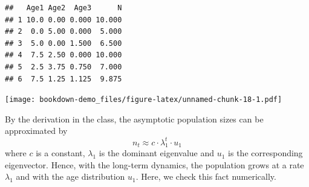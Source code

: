 \documentclass[
]{book}
\newenvironment{Shaded}{\begin{snugshade}}{\end{snugshade}}
\newcommand{\CommentTok}[1]{\textcolor[rgb]{0.56,0.35,0.01}{\textit{#1}}}
\newcommand{\DataTypeTok}[1]{\textcolor[rgb]{0.13,0.29,0.53}{#1}}
\newcommand{\DecValTok}[1]{\textcolor[rgb]{0.00,0.00,0.81}{#1}}
\newcommand{\KeywordTok}[1]{\textcolor[rgb]{0.13,0.29,0.53}{\textbf{#1}}}
\newcommand{\NormalTok}[1]{#1}
\newcommand{\OperatorTok}[1]{\textcolor[rgb]{0.81,0.36,0.00}{\textbf{#1}}}
\newcommand{\StringTok}[1]{\textcolor[rgb]{0.31,0.60,0.02}{#1}}
\begin{document}
\begin{verbatim}
##   Age1 Age2  Age3      N
## 1 10.0 0.00 0.000 10.000
## 2  0.0 5.00 0.000  5.000
## 3  5.0 0.00 1.500  6.500
## 4  7.5 2.50 0.000 10.000
## 5  2.5 3.75 0.750  7.000
## 6  7.5 1.25 1.125  9.875
\end{verbatim}

\begin{Shaded}
\end{Shaded}

\texttt{[image: bookdown-demo\_files/figure-latex/unnamed-chunk-18-1.pdf]}

By the derivation in the class, the asymptotic population sizes can be approximated by
\[
n_t \approx c\cdot \lambda_1^t\cdot u_1
\]
where \(c\) is a constant, \(\lambda_1\) is the dominant eigenvalue and \(u_1\) is the corresponding eigenvector. Hence, with the long-term dynamics, the population grows at a rate \(\lambda_1\) and with the age distribution \(u_1\). Here, we check this fact numerically.

\begin{Shaded}
\end{Shaded}
\end{document}
